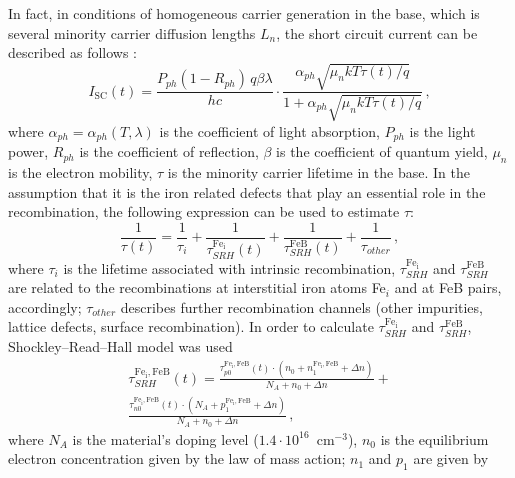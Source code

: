 \documentclass[%
 aip,jap,
 amsmath,amssymb,
 reprint,%
]{revtex4-1}
\begin{document}
In fact, in conditions of homogeneous carrier generation in the base, which is several minority carrier diffusion lengths $L_n$, 
the short circuit current can be described as follows \cite{Bube,Razeghi}:
\begin{equation}
\label{eqIsc}
I_\mathrm{SC}(t)=\frac{P_{ph}(1-R_{ph})\,q\beta\lambda}{hc}\cdot
\frac{\alpha_{ph}\sqrt{\mu_n k T \tau(t)/q}}{1+\alpha_{ph}\sqrt{\mu_n k T \tau(t)/q}}\,,
\end{equation}
where 
$\alpha_{ph}=\alpha_{ph}(T,\lambda)$ is the coefficient of light absorption, 
$P_{ph}$ is the light power, 
$R_{ph}$ is the coefficient of reflection, 
$\beta$ is the coefficient of quantum  yield, 
$\mu_n$ is the electron mobility, 
$\tau$ is the minority carrier lifetime in the base. 
In the assumption that it is the iron related defects that play an essential role in the recombination, the following expression can be used to estimate $\tau$:
\begin{equation}
\label{eqTau}
\frac{1}{\tau(t)}=\frac{1}{\tau_i}+\frac{1}{\tau_{SRH}^{\mathrm{Fe_i}}(t)}
+\frac{1}{\tau_{SRH}^\mathrm{FeB}(t)}+\frac{1}{\tau_{other}}\,,
\end{equation}
where 
$\tau_i$ is the lifetime associated with intrinsic recombination, 
$\tau_{SRH}^{\mathrm{Fe_i}}$ and $\tau_{SRH}^\mathrm{FeB}$ are related to the recombinations at interstitial iron atoms Fe$_i$ and at FeB pairs, accordingly; 
$\tau_{other}$ describes further recombination channels 
(other impurities, lattice defects, surface recombination). 
In order to calculate $\tau_{SRH}^{\mathrm{Fe_i}}$ and $\tau_{SRH}^\mathrm{FeB}$, 
Shockley--Read--Hall model was used
\begin{eqnarray}
\label{eqTauSRH}
\tau_{SRH}^\mathrm{Fe_i,FeB}(t)=\frac{\tau_{p0}^\mathrm{Fe_i,FeB}(t)
\cdot(n_0+n_1^\mathrm{Fe_i,FeB}+\Delta n)}
{N_A+n_0+\Delta n}+\nonumber\\
\frac{\tau_{n0}^\mathrm{Fe_i,FeB}(t)\cdot(N_A+p_1^\mathrm{Fe_i,FeB}+\Delta n)}
{N_A+n_0+\Delta n}\,,
\end{eqnarray}
where 
$N_A$ is the material’s doping level ($1.4\cdot10^{16}$~cm$^{-3}$), 
$n_0$ is the equilibrium electron concentration given by the law of mass action; 
$n_1$ and $p_1$ are given by
\end{document}
